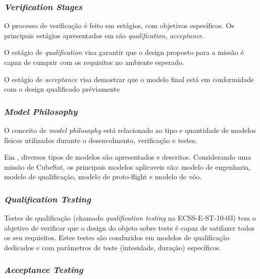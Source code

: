 \subsubsection*{\textit{Verification Stages}}

O processo de verificação é feito em estágios, com objetivos específicos. Os principais estágios apresentados em \textcite{ecss-e-st-10-02} são \textit{qualification}, \textit{acceptance}.

O estágio de \textit{qualification} visa garantir que o design proposto para a missão é capaz de cumprir com os requisitos no ambiente esperado.

O estágio de \textit{acceptance} visa demostrar que o modelo final  está em conformidade com o design qualificado préviamente


\subsubsection*{\textit{Model Philosophy}}

O conceito de \textit{model philosophy} está relacionado ao tipo e quantidade de modelos físicos utilizados durante o desenvolmento, verificação e testes.

Em \cite{ecss-e-hb-10-02}, diversos tipos de modelos são apresentados e descritos. Considerando uma missão de CubeSat, os principais modelos aplicaveis são: modelo de engenharia, modelo de qualificação, modelo de proto-flight e modelo de vôo.


\subsubsection*{\textit{Qualification Testing}}

Testes de qualificação (chamado \textit{qualification testing} na ECSS-E-ST-10-03) tem o objetivo de verificar que o design do objeto sobre teste é capaz de satifazer todos os seu requisitos. Estes testes são conduzidos em modelos de qualificação dedicados e com parâmetros de teste (intesidade, duração) específicos.


\subsubsection*{\textit{Acceptance Testing}}

